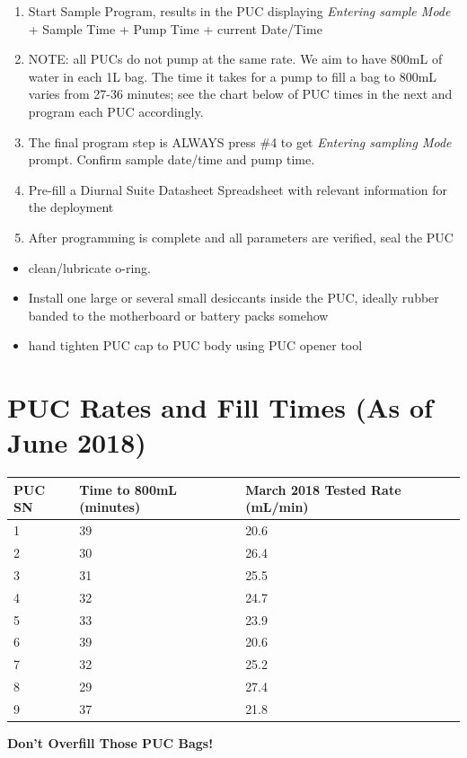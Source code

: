 \documentclass[]{book}
\providecommand{\tightlist}{%
  \setlength{\itemsep}{0pt}\setlength{\parskip}{0pt}}
\begin{document}
\begin{enumerate}
\def\labelenumi{\arabic{enumi}.}
\setcounter{enumi}{6}
\item
  Start Sample Program, results in the PUC displaying \emph{Entering sample Mode} + Sample Time + Pump Time + current Date/Time
\item
  NOTE: all PUCs do not pump at the same rate. We aim to have 800mL of water in each 1L bag. The time it takes for a pump to fill a bag to 800mL varies from 27-36 minutes; see the chart below of PUC times in the next and program each PUC accordingly.
\item
  The final program step is ALWAYS press \#4 to get \emph{Entering sampling Mode} prompt. Confirm sample date/time and pump time.
\item
  Pre-fill a Diurnal Suite Datasheet Spreadsheet with relevant information for the deployment
\item
  After programming is complete and all parameters are verified, seal the PUC
\end{enumerate}

\begin{itemize}
\tightlist
\item
  clean/lubricate o-ring.
\item
  Install one large or several small desiccants inside the PUC, ideally rubber banded to the motherboard or battery packs somehow
\item
  hand tighten PUC cap to PUC body using PUC opener tool
\end{itemize}

\hypertarget{puc-rates-and-fill-times-as-of-june-2018}{%
\section{PUC Rates and Fill Times (As of June 2018)}\label{puc-rates-and-fill-times-as-of-june-2018}}

\begin{longtable}[]{@{}lll@{}}
\toprule
\textbf{PUC SN} & \textbf{Time to 800mL (minutes)} & \textbf{March 2018 Tested Rate (mL/min)}\tabularnewline
\midrule
\endhead
1 & 39 & 20.6\tabularnewline
2 & 30 & 26.4\tabularnewline
3 & 31 & 25.5\tabularnewline
4 & 32 & 24.7\tabularnewline
5 & 33 & 23.9\tabularnewline
6 & 39 & 20.6\tabularnewline
7 & 32 & 25.2\tabularnewline
8 & 29 & 27.4\tabularnewline
9 & 37 & 21.8\tabularnewline
\bottomrule
\end{longtable}

\textbf{Don't Overfill Those PUC Bags!}
\end{document}
